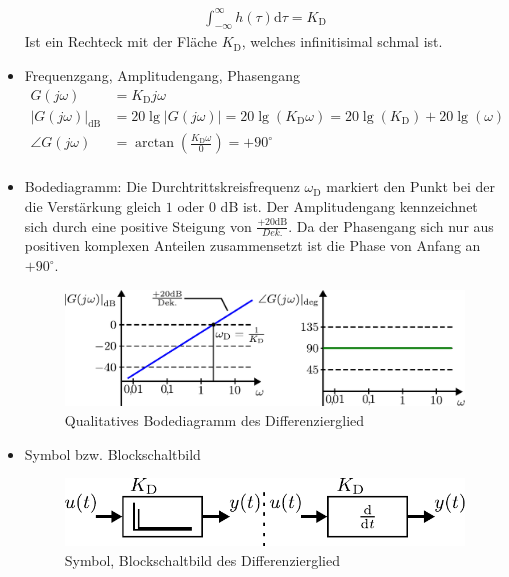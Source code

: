 \begin{itemize}
	\begin{equation*}
	\begin{aligned}
	\int_{-\infty}^{\infty}h(\tau)\text{d}\tau=K_{\text{D}}
	\end{aligned}
	\end{equation*}
	Ist ein Rechteck mit der Fläche $K_{\text{D}}$, welches infinitisimal schmal ist.
	\item Frequenzgang, Amplitudengang, Phasengang
	\begin{equation*}
	\begin{aligned}
	G(j\omega)&=K_{\text{D}}j\omega\\
	|G(j\omega)|_{\text{dB}}&=20\lg|G(j\omega)|=20\lg\left(K_{\text{D}}\omega\right)=20\lg\left(K_{\text{D}}\right)+20\lg\left(\omega\right)\\
	\angle G(j\omega)&=\arctan\left(\frac{K_{\text{D}}\omega}{0}\right)=+90^{\circ}\\
	\end{aligned}
	\end{equation*}
	\item Bodediagramm: Die Durchtrittskreisfrequenz $\omega_{\text{D}}$ markiert den Punkt bei der die Verstärkung gleich $1$ oder $0$ dB ist. Der Amplitudengang kennzeichnet sich durch eine positive Steigung von $\frac{+20\text{dB}}{Dek.}$. Da der Phasengang sich nur aus positiven komplexen Anteilen zusammensetzt ist die Phase von Anfang an $+90^{\circ}$.
	\begin{figure}[h]
		\centering
		\includegraphics[width=0.8\linewidth]{Abbildungen/Modellbildung/PDF/DgliedBode.pdf}
		\caption{Qualitatives Bodediagramm des Differenzierglied}
		\label{fig:dgliedbode}
	\end{figure}
	\item Symbol bzw. Blockschaltbild
	\begin{figure}[h]
		\centering
		\includegraphics[width=0.65\linewidth]{Abbildungen/Modellbildung/PDF/DgliedBlock.pdf}
		\caption{Symbol, Blockschaltbild des Differenzierglied}
		\label{fig:dglied}
	\end{figure}
\end{itemize}
%
